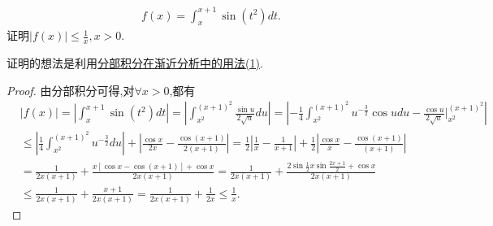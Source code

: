 \documentclass[lang=cn,newtx,10pt,scheme=chinese]{elegantbook}
\begin{document}
\begin{example}
\begin{align*}
   f\left( x \right) =\int_x^{x+1}{\sin \left( t^2 \right) dt}.
\end{align*}
证明$\left| f\left( x \right) \right|\le \frac{1}{x},x>0$.
\end{example}
\begin{note}
证明的想法是利用\hyperref[分部积分在渐近分析中的用法(1)]{分部积分在渐近分析中的用法(1)}.
\end{note}
\begin{proof}
由分部积分可得,对$\forall x>0$,都有
\begin{align*}
&\left| f\left( x \right) \right|=\left| \int_x^{x+1}{\sin \left( t^2 \right) dt} \right|=\left| \int_{x^2}^{\left( x+1 \right) ^2}{\frac{\sin u}{2\sqrt{u}}du} \right|=\left| -\frac{1}{4}\int_{x^2}^{\left( x+1 \right) ^2}{u^{-\frac{3}{2}}\cos udu}-\frac{\cos u}{2\sqrt{u}}\Big|_{x^2}^{\left( x+1 \right) ^2} \right|
\\
&\leqslant \left| \frac{1}{4}\int_{x^2}^{\left( x+1 \right) ^2}{u^{-\frac{3}{2}}du} \right|+\left| \frac{\cos x}{2x}-\frac{\cos \left( x+1 \right)}{2\left( x+1 \right)} \right|=\frac{1}{2}\left| \frac{1}{x}-\frac{1}{x+1} \right|+\frac{1}{2}\left| \frac{\cos x}{x}-\frac{\cos \left( x+1 \right)}{\left( x+1 \right)} \right|
\\
&=\frac{1}{2x\left( x+1 \right)}+\frac{x\left[ \cos x-\cos \left( x+1 \right) \right] +\cos x}{2x\left( x+1 \right)}=\frac{1}{2x\left( x+1 \right)}+\frac{2\sin \frac{1}{2}x\sin \frac{2x+1}{2}+\cos x}{2x\left( x+1 \right)}
\\
&\le \frac{1}{2x\left( x+1 \right)}+\frac{x+1}{2x\left( x+1 \right)}=\frac{1}{2x\left( x+1 \right)}+\frac{1}{2x}\leqslant \frac{1}{x}.
   \end{align*}
\end{proof}
\end{document}
